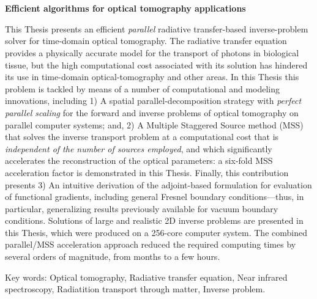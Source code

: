 \pagestyle{empty}
\chapter*{}
\clearpage \pagebreak 
\begin{center}
\begin{large}
\textbf{Efficient algorithms for optical tomography applications}
\end{large}
\end{center}

\vspace{1cm}
This Thesis presents an efficient {\em parallel} radiative
  transfer-based inverse-problem solver for time-domain optical
  tomography. The radiative transfer equation provides a physically
  accurate model for the transport of photons in biological tissue,
  but the high computational cost associated with its solution has
  hindered its use in time-domain optical-tomography and other
  areas. In this Thesis this problem is tackled by means of a number of
  computational and modeling innovations, including 1) A spatial
  parallel-decomposition strategy with \textit{perfect parallel
    scaling} for the forward and inverse problems of optical
  tomography on parallel computer systems; and, 2) A Multiple
  Staggered Source method (MSS) that solves the inverse transport
  problem at a computational cost that is {\em independent of the
    number of sources employed}, and which significantly accelerates
  the reconstruction of the optical parameters: a six-fold MSS
  acceleration factor is demonstrated in this Thesis. Finally, this
  contribution presents 3) An intuitive derivation of the
  adjoint-based formulation for evaluation of functional gradients,
  including general Fresnel boundary conditions---thus, in particular,
  generalizing results previously available for vacuum boundary
  conditions. Solutions of large and realistic 2D inverse problems are
  presented in this Thesis, which were produced on a 256-core computer
  system. The combined parallel/MSS acceleration approach reduced the
  required computing times by several orders of magnitude, from months
  to a few hours.


\vspace{1cm}
\noindent
Key words: 
Optical tomography,
Radiative transfer equation, 
Near infrared spectroscopy, 
Radiatition transport through matter,
Inverse problem.
\pagestyle{empty}
